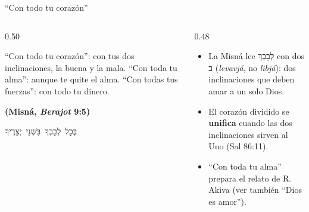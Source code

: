 \documentclass[hyperref={bookmarks=false},aspectratio=169]{beamer}
\newcommand{\heb}[1]{\mbox{\foreignlanguage{hebrew}{#1}}}
\newcommand{\fuente}[1]{\par\hfill{\upshape\bfseries\footnotesize\textcolor{azul}{#1}}}
\newcommand{\destacar}[1]{\textbf{\textcolor{azul}{#1}}}
\begin{document}
\begin{frame}{``Con todo tu corazón''}
\begin{columns}[t,onlytextwidth]
\begin{column}{0.50\textwidth}
\begin{cita}[colback=dorado!10!papiro,colframe=dorado!80!azul,fontupper=\scriptsize\itshape]``Con todo tu corazón'': con tus dos inclinaciones, la buena y la mala. ``Con toda tu alma'': aunque te quite el alma. ``Con todas tus fuerzas'': con todo tu dinero.\fuente{(Misná, \emph{Berajot} 9:5)}\end{cita}
\begin{center}\scriptsize\heb{בְּכָל לְבָבְךָ בִּשְׁנֵי יְצָרֶיךָ}\end{center}
\end{column}
\begin{column}{0.48\textwidth}\small
\begin{itemize}
\item La Misná lee \heb{לְבָבְךָ} con dos \heb{ב} (\emph{levavjá}, no \emph{libjá}): dos inclinaciones que deben amar a un solo Dios.
\item El corazón dividido se \destacar{unifica} cuando las dos inclinaciones sirven al Uno (Sal 86:11).
\item ``Con toda tu alma'' prepara el relato de R. Akiva (ver también ``Dios es amor'').
\end{itemize}
\end{column}
\end{columns}
\end{frame}
\end{document}
